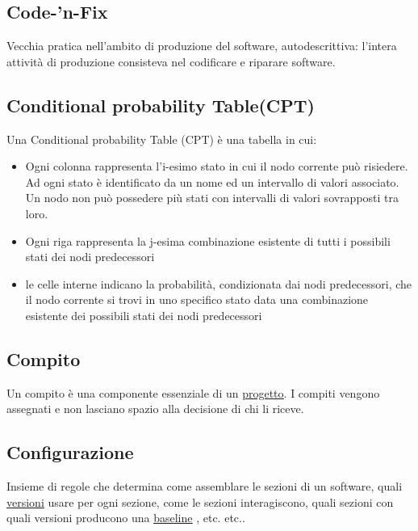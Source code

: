 	\subsection{Code-'n-Fix}
	\label{sec:codenfix}
	Vecchia pratica nell'ambito di produzione del software, autodescrittiva: l'intera attività di produzione consisteva nel codificare e riparare software.
	\subsection{Conditional probability Table(CPT)}
	\label{sec:CPT}
	Una Conditional probability Table (CPT) è una tabella in cui:
		\begin{itemize}
			\item{Ogni colonna rappresenta l'i-esimo stato in cui il nodo corrente può risiedere. Ad ogni stato è identificato da un nome ed un intervallo di valori associato. Un nodo non può possedere più stati con intervalli di valori sovrapposti tra loro.}
			\item{Ogni riga rappresenta la j-esima combinazione esistente di tutti i possibili stati dei nodi predecessori}
			\item{le celle interne indicano la probabilità, condizionata dai nodi predecessori, che il nodo corrente si trovi in uno specifico stato data una combinazione esistente dei possibili stati dei nodi predecessori}
		\end{itemize}
	\subsection{Compito}
	\label{sec:compiti}
	Un compito è una componente essenziale di un \underline{\hyperref[sec:progetto]{progetto}}. I compiti vengono assegnati e non lasciano spazio alla decisione di chi li riceve.
	
	\subsection{Configurazione}
	\label{sec:configurazione}
	Insieme di regole che determina come assemblare le sezioni di un software, quali \underline{\hyperref[sec:versione]{versioni}} usare per ogni sezione, come le sezioni interagiscono, quali sezioni con quali versioni producono una \underline{\hyperref[sec:baseline]{baseline}} , etc. etc..
	
